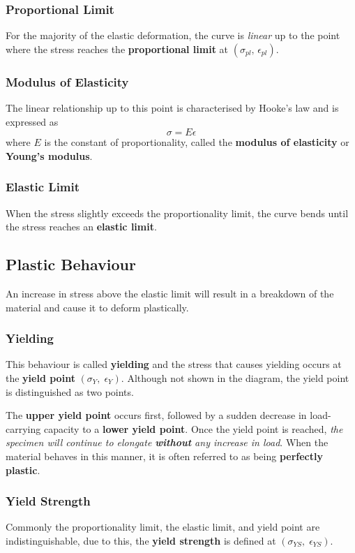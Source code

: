 \documentclass{article}
\begin{document}
\subsubsection{Proportional Limit}
For the majority of the elastic deformation, the curve is \textit{linear}
up to the point where the stress reaches the \textbf{proportional limit}
at \(\left( \sigma_{pl},\, \epsilon_{pl} \right)\).
\subsubsection{Modulus of Elasticity}
The linear relationship up to this point is characterised by Hooke's law and is expressed as
\begin{equation*}
    \sigma = E \epsilon
\end{equation*}
where \(E\) is the constant of proportionality, called the \textbf{modulus of elasticity}
or \textbf{Young's modulus}.
\subsubsection{Elastic Limit}
When the stress slightly exceeds the proportionality limit,
the curve bends until the stress reaches an \textbf{elastic limit}.
\subsection{Plastic Behaviour}
An increase in stress above the elastic limit will result in a breakdown of the material
and cause it to deform plastically.
\subsubsection{Yielding}
This behaviour is called \textbf{yielding}
and the stress that causes yielding occurs at the \textbf{yield point}
\(\left( \sigma_{Y},\; \epsilon_{Y} \right)\).
Although not shown in the diagram, the yield point is distinguished as two points.

The \textbf{upper yield point} occurs first, followed by a sudden decrease in load-carrying capacity
to a \textbf{lower yield point}. Once the yield point is reached, \textit{the specimen will continue to
    elongate \textbf{without} any increase in load}. When the material behaves in this manner,
it is often referred to as being \textbf{perfectly plastic}.
\subsubsection{Yield Strength}
Commonly the proportionality limit, the elastic limit, and yield point are indistinguishable,
due to this, the \textbf{yield strength} is defined at \(\left( \sigma_{YS},\; \epsilon_{YS} \right)\).
\end{document}
